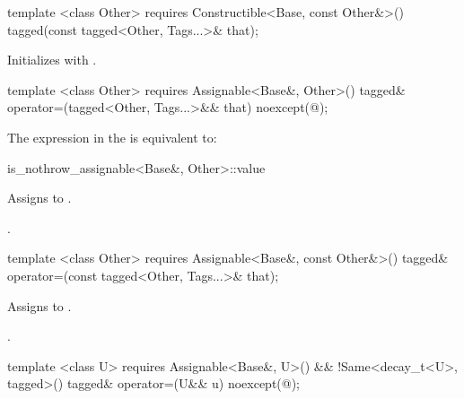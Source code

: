 \begin{itemdecl}
template <class Other>
  requires Constructible<Base, const Other&>()
tagged(const tagged<Other, Tags...>& that);
\end{itemdecl}

\begin{itemdescr}
\pnum
\effects Initializes  with .
\end{itemdescr}

\begin{itemdecl}
template <class Other>
  requires Assignable<Base&, Other>()
tagged& operator=(tagged<Other, Tags...>&& that) noexcept(@\seebelow@);
\end{itemdecl}

\begin{itemdescr}
\pnum
\remarks The expression in the  is equivalent to:

\begin{codeblock}
is_nothrow_assignable<Base&, Other>::value
\end{codeblock}

\pnum
\effects Assigns  to .

\pnum
\returns {}.
\end{itemdescr}

\begin{itemdecl}
template <class Other>
  requires Assignable<Base&, const Other&>()
tagged& operator=(const tagged<Other, Tags...>& that);
\end{itemdecl}

\begin{itemdescr}
\pnum
\effects Assigns  to .

\pnum
\returns {}.
\end{itemdescr}

\begin{itemdecl}
template <class U>
  requires Assignable<Base&, U>() && !Same<decay_t<U>, tagged>()
tagged& operator=(U&& u) noexcept(@\seebelow@);
\end{itemdecl}

